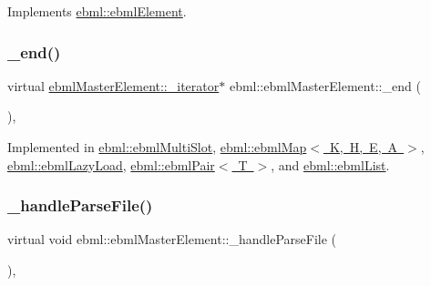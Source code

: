 Implements \mbox{\hyperlink{classebml_1_1ebmlElement_a27bd9de14e1706840235b68331917776}{ebml\+::ebml\+Element}}.

\mbox{\label{classebml_1_1ebmlMasterElement_a352e5e11836063394990cb05c09d8e48}} 
\subsubsection{\texorpdfstring{\+\_\+end()}{\_end()}}
{\footnotesize\ttfamily virtual \mbox{\hyperlink{classebml_1_1ebmlMasterElement_1_1__iterator}{ebml\+Master\+Element\+::\+\_\+iterator}}$\ast$ ebml\+::ebml\+Master\+Element\+::\+\_\+end (\begin{DoxyParamCaption}{ }\end{DoxyParamCaption})\hspace{0.3cm}{\ttfamily [protected]}, {}}



Implemented in \mbox{\hyperlink{classebml_1_1ebmlMultiSlot_a8374290bfe21447729ed0331eb845905}{ebml\+::ebml\+Multi\+Slot}}, \mbox{\hyperlink{classebml_1_1ebmlMap_a8b6a25187190a26a7988d4bbaf853d78}{ebml\+::ebml\+Map$<$ K, H, E, A $>$}}, \mbox{\hyperlink{classebml_1_1ebmlLazyLoad_a59f66900110cfdb7e6b44558aa4e5997}{ebml\+::ebml\+Lazy\+Load}}, \mbox{\hyperlink{classebml_1_1ebmlPair_aa9885eed27f8a81efe246b5a6755186b}{ebml\+::ebml\+Pair$<$ T $>$}}, and \mbox{\hyperlink{classebml_1_1ebmlList_aec7a5554e1d10fd7575104471cb2c6f4}{ebml\+::ebml\+List}}.

\mbox{\label{classebml_1_1ebmlMasterElement_ab0cf3b000a54169e233f38aef9dcb4e1}} 
\subsubsection{\texorpdfstring{\+\_\+handle\+Parse\+File()}{\_handleParseFile()}}
{\footnotesize\ttfamily virtual void ebml\+::ebml\+Master\+Element\+::\+\_\+handle\+Parse\+File (\begin{DoxyParamCaption}\item[{const \mbox{\hyperlink{classebml_1_1parseFile}{parse\+File}} \&}]{ }\end{DoxyParamCaption})\hspace{0.3cm}{\ttfamily [protected]}, {\ttfamily [virtual]}}



